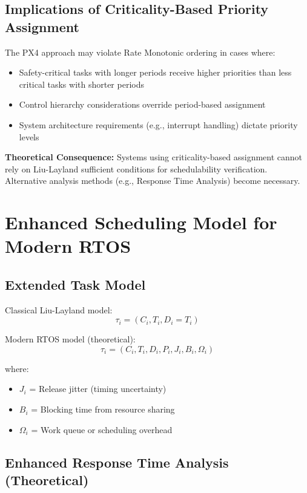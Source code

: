 \documentclass[12pt,a4paper]{article}
\begin{document}
\subsection{Implications of Criticality-Based Priority Assignment}

The PX4 approach may violate Rate Monotonic ordering in cases where:
\begin{itemize}
\item Safety-critical tasks with longer periods receive higher priorities than less critical tasks with shorter periods
\item Control hierarchy considerations override period-based assignment
\item System architecture requirements (e.g., interrupt handling) dictate priority levels
\end{itemize}

\textbf{Theoretical Consequence:} Systems using criticality-based assignment cannot rely on Liu-Layland sufficient conditions for schedulability verification. Alternative analysis methods (e.g., Response Time Analysis) become necessary.

\section{Enhanced Scheduling Model for Modern RTOS}

\subsection{Extended Task Model}

Classical Liu-Layland model:
\begin{equation}
\tau_i = (C_i, T_i, D_i = T_i)
\end{equation}

Modern RTOS model (theoretical):
\begin{equation}
\tau_i = (C_i, T_i, D_i, P_i, J_i, B_i, \Omega_i)
\end{equation}

where:
\begin{itemize}
\item $J_i$ = Release jitter (timing uncertainty)
\item $B_i$ = Blocking time from resource sharing
\item $\Omega_i$ = Work queue or scheduling overhead
\end{itemize}

\subsection{Enhanced Response Time Analysis (Theoretical)}
\end{document}
